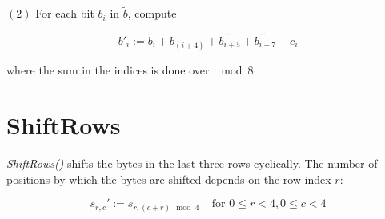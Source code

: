 \documentclass[a4paper, 12pt]{article}
\begin{document}
$(2)$ For each bit $b_i$ in $\widetilde{ b } $, compute 

\begin{equation*}
    b'_i := \widetilde{ b_i } + b_{(i+4) } + \widetilde{ b_{i+5  } }  + \widetilde{ b_{i+7  } }  + c_i
\end{equation*}

where the sum in the indices is done over $\mod 8$.

\section{ShiftRows}

\textit{ShiftRows()} shifts the bytes in the last three rows cyclically. The number of positions 
by which the bytes are shifted depends on the row index $r$:

\begin{equation*}
    s_{r,c}' := s_{r, (c+r)\mod 4} ~ ~ ~ ~ ~ \text{for } 0 \leq r < 4, 0 \leq c < 4
\end{equation*}
\end{document}
